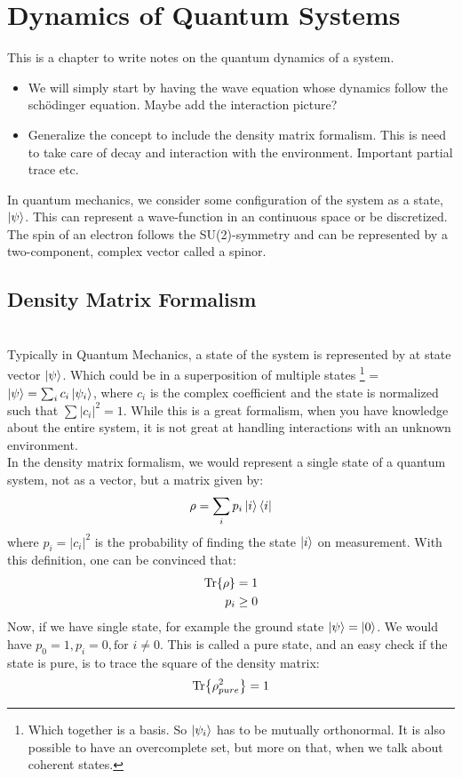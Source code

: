 \chapter{Dynamics of Quantum Systems}
This is a chapter to write notes on the quantum dynamics of a system.
\begin{itemize}
    \item We will simply start by having the wave equation whose dynamics follow the schödinger equation. Maybe add the interaction picture? 
    \item Generalize the concept to include the density matrix formalism. This  is need to take care of decay and interaction with the environment. Important partial trace etc.
\end{itemize}
In quantum mechanics, we consider some configuration of the system as a state, $\ket{\psi}$. This can represent a wave-function in an continuous space or be discretized. The spin of an electron follows the SU(2)-symmetry and can be represented by a two-component, complex vector called a spinor.  

\section{Density Matrix Formalism}
\\ 
Typically in Quantum Mechanics, a state of the system is represented by at state vector $\ket{\psi}$. Which could be in a superposition of multiple states \footnote{Which together is a basis. So {$\ket{\psi_i}$} has to be mutually orthonormal. It is also possible to have an overcomplete set, but more on that, when we talk about coherent states.} = $\ket{\psi} = \sum_i c_i\ket{\psi_i}$, where $c_i$ is the complex coefficient and the state is normalized such that $\sum |c_i|^2 = 1$. While this is a great formalism, when you have knowledge about the entire system, it is not great at handling interactions with an unknown environment. 
\\
In the density matrix formalism, we would represent a single state of a quantum system, not as a vector, but a matrix given by:
\begin{equation}
    \rho = \sum_i p_i \ket{i}\bra{i}
\end{equation}
where $p_i = |c_i|^2$ is the probability of finding the state $\ket{i}$ on measurement. With this definition, one can be convinced that:
\begin{align}
    \Tr{\rho} &= 1 \\
    p_i &\geq 0
\end{align}
Now, if we have single state, for example the ground state $\ket{\psi} = \ket{0}$. We would have $p_0 = 1, p_i = 0, \text{for } i \neq 0$. This is called a pure state, and an easy check if the state is pure, is to trace the square of the density matrix:
\begin{equation}
    \Tr{\rho_{pure}^2} = 1
\end{equation}

